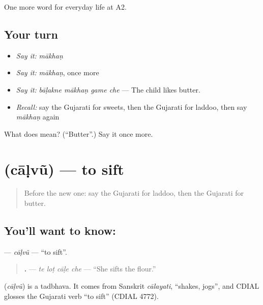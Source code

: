\begin{grammarlens}[title={What you've built}]
One more word for everyday life at A2.
\end{grammarlens}

\subsection*{Your turn}
\begin{itemize}
\raggedright
  \item \emph{Say it:} \emph{mākhaṇ}
  \item \emph{Say it:} \emph{mākhaṇ}, once more
  \item \emph{Say it:} \emph{bāḷakne mākhaṇ game che} — The child likes butter.
  \item \emph{Recall:} say the Gujarati for sweets, then the Gujarati for laddoo, then say \emph{mākhaṇ} again
\end{itemize}

\begin{tcolorbox}[breakable,colback=teal!4,colframe=teal!35!black,title={Before you move on}]
What does  mean? (\textquotedblleft{}Butter\textquotedblright{}.) Say it once more.
\end{tcolorbox}
\section[\texorpdfstring{\gu{ચાળવું} (cāḷvũ)}{ચાળવું (cāḷvũ)}]{ (cāḷvũ) — to sift}

\label{lesson:GU-C170-calvu}



\begin{quote}
Before the new one: say the Gujarati for laddoo, then the Gujarati for butter.
\end{quote}

\subsection*{You'll want to know: }
\textbf{} — \emph{cāḷvũ} — \textquotedblleft{}to sift\textquotedblright{}.

\begin{quote}
\textbf{   .} — \emph{te loṭ cāḷe che} — \textquotedblleft{}She sifts the flour.\textquotedblright{}
\end{quote}

\begin{cousinweb}
\textbf{} (\emph{cāḷvũ}) is a tadbhava. It comes from Sanskrit \emph{cālayati}, \textquotedblleft{}shakes, jogs\textquotedblright{}, and CDIAL glosses the Gujarati verb \textquotedblleft{}to sift\textquotedblright{} (CDIAL 4772).
\end{cousinweb}

